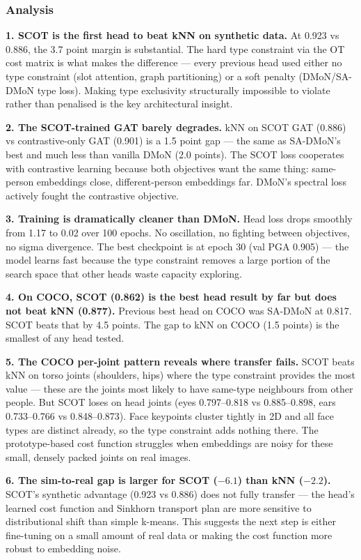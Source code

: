 \subsubsection{Analysis}

\textbf{1. SCOT is the first head to beat kNN on synthetic data.} At 0.923 vs 0.886, the 3.7 point margin is substantial. The hard type constraint via the OT cost matrix is what makes the difference --- every previous head used either no type constraint (slot attention, graph partitioning) or a soft penalty (DMoN/SA-DMoN type loss). Making type exclusivity structurally impossible to violate rather than penalised is the key architectural insight.

\textbf{2. The SCOT-trained GAT barely degrades.} kNN on SCOT GAT (0.886) vs contrastive-only GAT (0.901) is a 1.5 point gap --- the same as SA-DMoN's best and much less than vanilla DMoN (2.0 points). The SCOT loss cooperates with contrastive learning because both objectives want the same thing: same-person embeddings close, different-person embeddings far. DMoN's spectral loss actively fought the contrastive objective.

\textbf{3. Training is dramatically cleaner than DMoN.} Head loss drops smoothly from 1.17 to 0.02 over 100 epochs. No oscillation, no fighting between objectives, no sigma divergence. The best checkpoint is at epoch 30 (val PGA 0.905) --- the model learns fast because the type constraint removes a large portion of the search space that other heads waste capacity exploring.

\textbf{4. On COCO, SCOT (0.862) is the best head result by far but does not beat kNN (0.877).} Previous best head on COCO was SA-DMoN at 0.817. SCOT beats that by 4.5 points. The gap to kNN on COCO (1.5 points) is the smallest of any head tested.

\textbf{5. The COCO per-joint pattern reveals where transfer fails.} SCOT beats kNN on torso joints (shoulders, hips) where the type constraint provides the most value --- these are the joints most likely to have same-type neighbours from other people. But SCOT loses on head joints (eyes 0.797--0.818 vs 0.885--0.898, ears 0.733--0.766 vs 0.848--0.873). Face keypoints cluster tightly in 2D and all face types are distinct already, so the type constraint adds nothing there. The prototype-based cost function struggles when embeddings are noisy for these small, densely packed joints on real images.

\textbf{6. The sim-to-real gap is larger for SCOT ($-6.1$) than kNN ($-2.2$).} SCOT's synthetic advantage (0.923 vs 0.886) does not fully transfer --- the head's learned cost function and Sinkhorn transport plan are more sensitive to distributional shift than simple k-means. This suggests the next step is either fine-tuning on a small amount of real data or making the cost function more robust to embedding noise.


